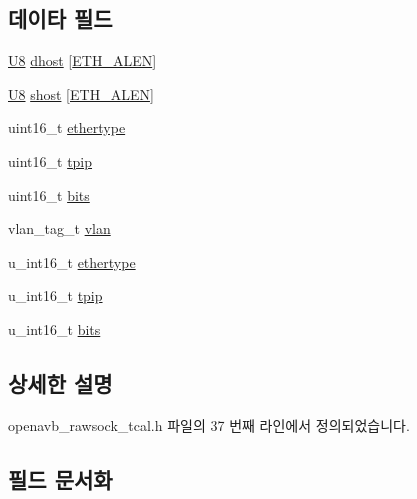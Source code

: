 \subsection*{데이타 필드}
\begin{DoxyCompactItemize}
\item 
\hyperlink{openavb__types__base__pub_8h_aa63ef7b996d5487ce35a5a66601f3e73}{U8} \hyperlink{struct____attribute_____a47cfe4a6145184651112ff8fe6dc80f8}{dhost} \mbox{[}\hyperlink{avb__avtp_8h_a9822d89774e0d6ddaa06503950130423}{E\+T\+H\+\_\+\+A\+L\+EN}\mbox{]}
\item 
\hyperlink{openavb__types__base__pub_8h_aa63ef7b996d5487ce35a5a66601f3e73}{U8} \hyperlink{struct____attribute_____ab9e6e094fa8006980b1a99e0c8e37432}{shost} \mbox{[}\hyperlink{avb__avtp_8h_a9822d89774e0d6ddaa06503950130423}{E\+T\+H\+\_\+\+A\+L\+EN}\mbox{]}
\item 
uint16\+\_\+t \hyperlink{struct____attribute_____aa3277a0009d97b5ec894357c7ce532cd}{ethertype}
\item 
uint16\+\_\+t \hyperlink{struct____attribute_____a2599bbd7f1fc82592e2364e874ea25af}{tpip}
\item 
uint16\+\_\+t \hyperlink{struct____attribute_____a0c1105f0af8d3db3f02c6174eb15a79a}{bits}
\item 
vlan\+\_\+tag\+\_\+t \hyperlink{struct____attribute_____a79672b379015abfaff45c2fb6b7e0669}{vlan}
\item 
u\+\_\+int16\+\_\+t \hyperlink{struct____attribute_____aa3277a0009d97b5ec894357c7ce532cd}{ethertype}
\item 
u\+\_\+int16\+\_\+t \hyperlink{struct____attribute_____ae6119a7211229b490a6e60b7c14c7c34}{tpip}
\item 
u\+\_\+int16\+\_\+t \hyperlink{struct____attribute_____a5bf9a142f4282e4c697c49ef9cf2b37a}{bits}
\end{DoxyCompactItemize}


\subsection{상세한 설명}


openavb\+\_\+rawsock\+\_\+tcal.\+h 파일의 37 번째 라인에서 정의되었습니다.



\subsection{필드 문서화}
